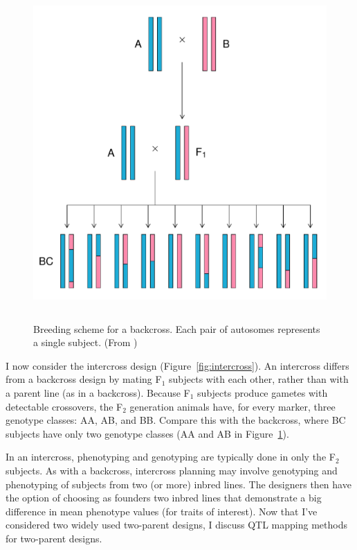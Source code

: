 \documentclass[oneside]{book}\usepackage[]{graphicx}\usepackage[]{color}
\makeatletter
\def\maxwidth{ %
  \ifdim\Gin@nat@width>\linewidth
    \linewidth
  \else
    \Gin@nat@width
  \fi
}
\newenvironment{knitrout}{}{} %
\def\maxwidth{\ifdim\Gin@nat@width>\linewidth\linewidth\else\Gin@nat@width\fi}
\makeatother
\begin{document}
\begin{knitrout}
\color{fgcolor}\begin{figure}
\includegraphics[width=\maxwidth,height=5in]{figure/backcross-1} \caption[Breeding scheme for a backcross]{Breeding scheme for a backcross. Each pair of autosomes represents a single subject. (From \citet{broman2009guide})}\label{fig:backcross}
\end{figure}


\end{knitrout}

I now consider the intercross design (Figure~\ref{fig:intercross}).
An intercross differs from a backcross design by mating F$_1$ subjects with each other,
rather than with a parent line (as in a backcross). Because F$_1$ subjects
produce gametes with detectable crossovers, the F$_2$ generation animals have,
for every marker, three genotype classes: AA, AB, and BB. Compare this with
the backcross, where BC subjects have only two genotype classes (AA and
AB in Figure~\ref{fig:backcross}).

In an intercross, phenotyping and genotyping are typically done in only the F$_2$ subjects.
As with a backcross, intercross planning may involve genotyping and phenotyping of
subjects from two (or more) inbred lines. The designers then have the option of
choosing as founders two inbred lines that demonstrate a big difference in
mean phenotype values (for traits of interest). Now that I've considered two widely used two-parent designs, I discuss QTL mapping methods for two-parent designs.
\end{document}
